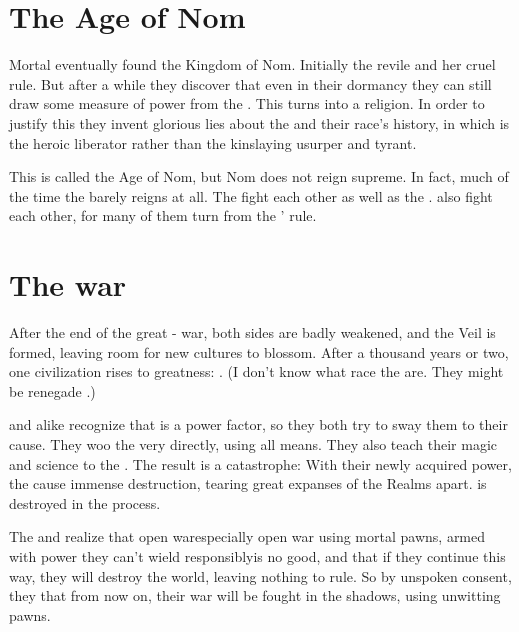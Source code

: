 \section{The Age of Nom}
Mortal \dragons{} eventually found the \Dragon{} Kingdom of Nom. Initially the \dragons{} revile \Xserasshana{} and her cruel rule. But after a while they discover that even in their dormancy they can still draw some measure of power from the \Dominators. This turns into a religion. In order to justify this they invent glorious lies about the \Dominators{} and their race's history, in which \Xserasshana{} is the heroic liberator rather than the kinslaying usurper and tyrant. 

This is called the Age of Nom, but Nom does not reign supreme. In fact, much of the time the \Dragonking{} barely reigns at all. The \dragons{} fight each other as well as the \resphain{}. \Resphain{} also fight each other, for many of them turn from the \banes{}' rule. 







\section{The \Cuezcan{} war}
\index{\Cuezca}
After the end of the great \dragon-\resphan{} war, both sides are badly weakened, and the Veil is formed, leaving room for new cultures to blossom. After a thousand years or two, one civilization rises to greatness: \Cuezca. (I don't know what race the \cuezcans{} are. They might be renegade \resphain.) 

\Dragons{} and \banes{} alike recognize that \Cuezca{} is a power factor, so they both try to sway them to their cause. They woo the \cuezcans{} very directly, using all means. They also teach their magic and science to the \cuezcans{}. The result is a catastrophe: With their newly acquired power, the \cuezcans{} cause immense destruction, tearing great expanses of the Realms apart. \Cuezca{} is destroyed in the process. 

The \dragons{} and \banes{} realize that open war\dash especially open war using mortal pawns, armed with power they can't wield responsibly\dash is no good, and that if they continue this way, they will destroy the world, leaving nothing to rule. So by unspoken consent, they  that from now on, their war will be fought in the shadows, using unwitting pawns. 

